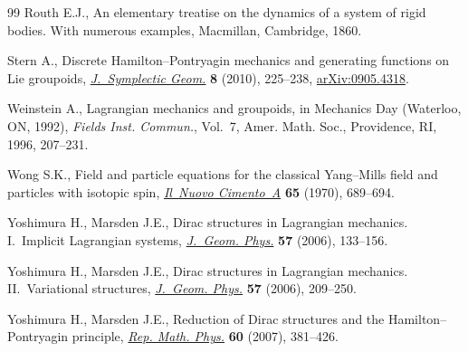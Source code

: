\documentclass[10pt,a4paper]{amsart}
\numberwithin{equation}{section}
\begin{document}
\begin{thebibliography}{99}
Routh E.J., An elementary treatise on the dynamics of a system of rigid bodies.
 With numerous examples, Macmillan, Cambridge, 1860.

Stern A., Discrete {H}amilton--{P}ontryagin mechanics and generating functions
 on {L}ie groupoids, \href{https://doi.org/10.4310/JSG.2010.v8.n2.a5}{\textit{J.~Symplectic Geom.}} \textbf{8} (2010), 225--238,
 \href{http://arxiv.org/abs/0905.4318}{arXiv:0905.4318}.

Weinstein A., Lagrangian mechanics and groupoids, in Mechanics Day ({W}aterloo,
 {ON}, 1992), \textit{Fields Inst. Commun.}, Vol.~7, Amer. Math. Soc.,
 Providence, RI, 1996, 207--231.

Wong S.K., Field and particle equations for the classical {Y}ang--{M}ills f\/ield
 and particles with isotopic spin, \href{https://doi.org/10.1007/BF02892134}{\textit{Il~Nuovo Cimento~A}} \textbf{65}
 (1970), 689--694.

Yoshimura H., Marsden J.E., Dirac structures in {L}agrangian mechanics.
 {I}.~{I}mplicit {L}agrangian systems, \href{https://doi.org/10.1016/j.geomphys.2006.02.009}{\textit{J.~Geom. Phys.}} \textbf{57}
 (2006), 133--156.

Yoshimura H., Marsden J.E., Dirac structures in {L}agrangian mechanics.
 {II}.~{V}ariational structures, \href{https://doi.org/10.1016/j.geomphys.2006.02.012}{\textit{J.~Geom. Phys.}} \textbf{57} (2006),
 209--250.

Yoshimura H., Marsden J.E., Reduction of {D}irac structures and the {H}amilton--{P}ontryagin principle, \href{https://doi.org/10.1016/S0034-4877(08)00004-9}{\textit{Rep. Math. Phys.}} \textbf{60}
 (2007), 381--426.

\end{thebibliography}
\end{document}
